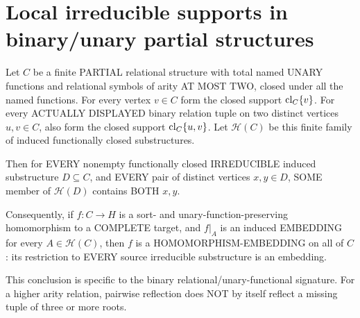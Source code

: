 \section{Local irreducible supports in binary/unary partial structures}
\label{sec:binary-unary-irreducible-local-cover}

\begin{lemma}
\label{lem:typed-binary-irreducible-local-cover}
Let \(C\) be a finite
PARTIAL relational
structure with total
named UNARY functions
and relational symbols
of arity AT MOST TWO,
closed under all the
named functions.
For every vertex \(v\in C\)
form the closed support
\(\operatorname{cl}_C\{v\}\).
For every ACTUALLY
DISPLAYED binary relation
tuple on two distinct
vertices \(u,v\in C\),
also form the closed
support \(\operatorname{cl}_C\{u,v\}\).
Let \(\mathscr H(C)\)
be this finite family
of induced functionally
closed substructures.

Then for EVERY nonempty
functionally closed
IRREDUCIBLE induced
substructure \(D\subseteq C\),
and EVERY pair of distinct
vertices \(x,y\in D\),
SOME member of
\(\mathscr H(D)\)
contains BOTH \(x,y\).

Consequently, if
\(f:C\to H\) is a
sort- and
unary-function-preserving
homomorphism to a
COMPLETE target, and
\(f|_A\) is an induced
EMBEDDING for every
\(A\in\mathscr H(C)\),
then \(f\) is a
HOMOMORPHISM-EMBEDDING
on all of \(C\):
its restriction to EVERY
source irreducible
substructure is an
embedding.

This conclusion is
specific to the binary
relational/unary-functional
signature. For a higher
arity relation, pairwise
reflection does NOT
by itself reflect a
missing tuple of
three or more roots.
\end{lemma}
